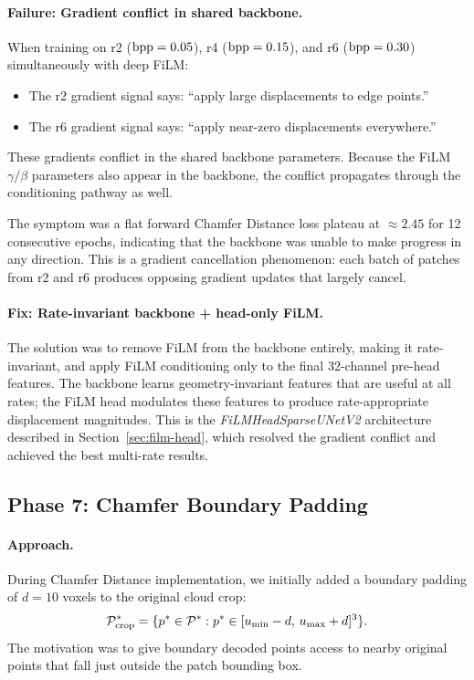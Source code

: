 \paragraph{Failure: Gradient conflict in shared backbone.}
When training on r2 ($\mathrm{bpp} = 0.05$), r4 ($\mathrm{bpp} = 0.15$), and r6 ($\mathrm{bpp} = 0.30$)
simultaneously with deep FiLM:
\begin{itemize}
  \item The r2 gradient signal says: ``apply large displacements to edge points.''
  \item The r6 gradient signal says: ``apply near-zero displacements everywhere.''
\end{itemize}
These gradients conflict in the shared backbone parameters.
Because the FiLM $\gamma/\beta$ parameters also appear in the backbone, the
conflict propagates through the conditioning pathway as well.

The symptom was a flat forward Chamfer Distance loss plateau at $\approx 2.45$
for 12 consecutive epochs, indicating that the backbone was unable to make
progress in any direction.
This is a gradient cancellation phenomenon: each batch of patches from r2 and
r6 produces opposing gradient updates that largely cancel.

\paragraph{Fix: Rate-invariant backbone + head-only FiLM.}
The solution was to remove FiLM from the backbone entirely, making it
rate-invariant, and apply FiLM conditioning only to the final 32-channel
pre-head features.
The backbone learns geometry-invariant features that are useful at all rates;
the FiLM head modulates these features to produce rate-appropriate displacement
magnitudes.
This is the \textit{FiLMHeadSparseUNetV2} architecture described in
Section~\ref{sec:film-head}, which resolved the gradient conflict and achieved
the best multi-rate results.

\subsection{Phase 7: Chamfer Boundary Padding}

\paragraph{Approach.}
During Chamfer Distance implementation, we initially added a boundary padding
of $d = 10$ voxels to the original cloud crop:
\begin{equation}
  \mathcal{P}^*_{\text{crop}} = \{p^* \in \mathcal{P}^* : p^* \in
    [u_{\min} - d,\, u_{\max} + d]^3\}.
\end{equation}
The motivation was to give boundary decoded points access to nearby original
points that fall just outside the patch bounding box.


